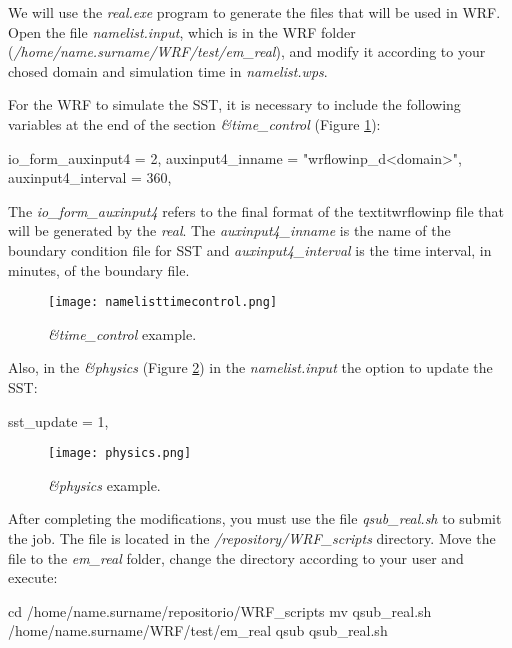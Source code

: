 \noindent We will use the \textit{real.exe} program to generate the files that will be used in WRF. Open the file \textit{namelist.input}, 
which is in the WRF folder (\textit{/home/name.surname/WRF/test/em\_real}), and modify it according to your chosed domain and simulation time in 
\textit{namelist.wps}.
\bigskip

\noindent For the WRF to simulate the SST, it is necessary to include the following variables at the end of the section 
\textit{\&time\_control} (Figure \textcolor{bleu_cite}{\ref{timecontrolnamelist}}):
\bigskip

\begin{bashcode}
io_form_auxinput4  = 2,
auxinput4_inname   = "wrflowinp_d<domain>",
auxinput4_interval = 360,
\end{bashcode}
\bigskip

\noindent The \textit{io\_form\_auxinput4} refers to the final format of the textit{wrflowinp} file that will be generated by 
the \textit{real}. The \textit{auxinput4\_inname} is the name of the boundary condition file for SST and \textit{auxinput4\_interval} 
is the time interval, in minutes, of the boundary file.
\bigskip

\begin{figure}[H]
    \centering
    \texttt{[image: namelisttimecontrol.png]}
    \caption{\textit{\&time\_control} example.}
    \label{timecontrolnamelist}
\end{figure}
\bigskip

\noindent Also, in the \textit{\&physics} (Figure \textcolor{bleu_cite}{\ref{physicsnamelist}}) in the \textit{namelist.input} 
the option to update the SST:
\bigskip

\begin{bashcode}
sst_update = 1,
\end{bashcode}
\bigskip

\begin{figure}[H]
    \centering
    \texttt{[image: physics.png]}
    \caption{\textit{\&physics} example.}
    \label{physicsnamelist}
\end{figure}
\bigskip

\noindent After completing the modifications, you must use the file \textit{qsub\_real.sh} to submit the job.
The file is located in the \textit{/repository/WRF\_scripts} directory. Move the file to the \textit{em\_real} folder, change the directory 
according to your user and execute:
\bigskip

\begin{bashcode}
cd /home/name.surname/repositorio/WRF_scripts
mv qsub_real.sh /home/name.surname/WRF/test/em_real
qsub qsub_real.sh
\end{bashcode}
\bigskip

